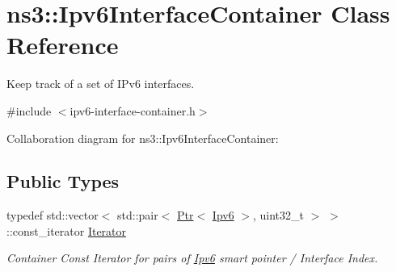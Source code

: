 \hypertarget{classns3_1_1Ipv6InterfaceContainer}{}\section{ns3\+:\+:Ipv6\+Interface\+Container Class Reference}
\label{classns3_1_1Ipv6InterfaceContainer}


Keep track of a set of I\+Pv6 interfaces.  




{\ttfamily \#include $<$ipv6-\/interface-\/container.\+h$>$}



Collaboration diagram for ns3\+:\+:Ipv6\+Interface\+Container\+:
\subsection*{Public Types}
\begin{DoxyCompactItemize}
\item 
typedef std\+::vector$<$ std\+::pair$<$ \hyperlink{classns3_1_1Ptr}{Ptr}$<$ \hyperlink{classns3_1_1Ipv6}{Ipv6} $>$, uint32\+\_\+t $>$ $>$\+::const\+\_\+iterator \hyperlink{classns3_1_1Ipv6InterfaceContainer_ad0dd912971eb260ce6a22cab34e809c0}{Iterator}
\begin{DoxyCompactList}\small\item\em Container Const Iterator for pairs of \hyperlink{classns3_1_1Ipv6}{Ipv6} smart pointer / Interface Index. \end{DoxyCompactList}\end{DoxyCompactItemize}
